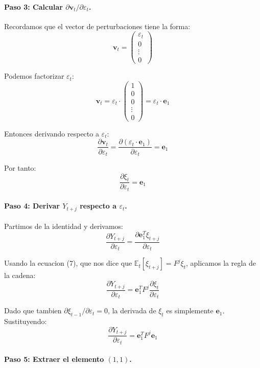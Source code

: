 \paragraph{Paso 3: Calcular $\partial \mathbf{v}_t / \partial \varepsilon_t$.}

Recordamos que el vector de perturbaciones tiene la forma:
\[
    \mathbf{v}_t = \begin{pmatrix} \varepsilon_t \\ 0 \\ \vdots \\ 0 \end{pmatrix}
\]

Podemos factorizar $\varepsilon_t$:
\[
    \mathbf{v}_t = \varepsilon_t \cdot \begin{pmatrix} 1 \\ 0 \\ 0 \\ \vdots \\ 0 \end{pmatrix}
    = \varepsilon_t \cdot \mathbf{e}_1
\]

Entonces derivando respecto a $\varepsilon_t$:
\[
    \frac{\partial \mathbf{v}_t}{\partial \varepsilon_t}
    = \frac{\partial (\varepsilon_t \cdot \mathbf{e}_1)}{\partial \varepsilon_t}
    = \mathbf{e}_1
\]

Por tanto:
\[
    \frac{\partial \xi_t}{\partial \varepsilon_t} = \mathbf{e}_1
\]

\paragraph{Paso 4: Derivar $Y_{t+j}$ respecto a $\varepsilon_t$.}

Partimos de la identidad y derivamos:
\[
    \frac{\partial Y_{t+j}}{\partial \varepsilon_t}
    = \frac{\partial \mathbf{e}_1^T \xi_{t+j}}{\partial \varepsilon_t}
\]

Usando la ecuacion (7), que nos dice que $\mathbb{E}_t[\xi_{t+j}] = F^j \xi_t$, aplicamos la regla de la cadena:
\[
    \frac{\partial Y_{t+j}}{\partial \varepsilon_t}
    = \mathbf{e}_1^T F^j \frac{\partial \xi_t}{\partial \varepsilon_t}
\]

Dado que tambien $\partial \xi_{t-1}/\partial \varepsilon_t = 0$, la derivada de $\xi_t$ es simplemente $\mathbf{e}_1$. Sustituyendo:
\[
    \frac{\partial Y_{t+j}}{\partial \varepsilon_t}
    = \mathbf{e}_1^T F^j \mathbf{e}_1
\]

\paragraph{Paso 5: Extraer el elemento $(1,1)$.}

